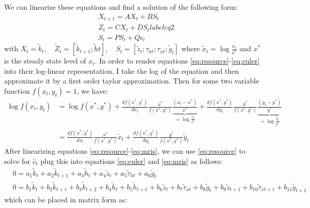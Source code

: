 \documentclass{article} %
\begin{document}
We can linearize these equations and find a solution of the following form:
\begin{align}
& X_{t+1} = A X_t + B S_t  \label{eq1} \\
& Z_t = C X_t + D S_t label{eq2} \\
& S_t = P S_t + Q \epsilon_t \label{eq3}
\end{align}
with $X_t = \tilde{k}_t, \quad \tilde{Z}_t =
[\tilde{k}_{t+1};\tilde{h}t], \quad S_t =
[\tilde{z}_t;\tau_{ht};\tau_{xt};\tilde{g}_{t}] $ where $\tilde{x}_t =
\log \frac{x_t}{x^*}$ and $x^*$ is the steady state level of
$x_t$.  In order to render equations \ref{eq:resource}-\ref{eq:euler} into their log-linear
representation, I take the log of the equation and then approximate it
by a first order taylor approximation. Then for some two variable
function $f(x_t,y_t) = 1$, we have:
\begin{align*}
 \log f(x_t,y_t) &= \log f(x^*,y^*) + \frac{df(x^*,y^*)}{dx_t} \frac{x^*}{f(x^*,y^*)}\underbrace{\frac{(x_t - x^*)}{x^*}}_{=\log \frac{x_t}{x^*}} + \frac{df(x^*,y^*)}{dy_t} \frac{y^*}{f(x^*,y^*)}\underbrace{\frac{(y_t - y^*)}{y^*}}_{=\log \frac{y_t}{y^*}} \\
& = \frac{df(x^*,y^*)}{dx_t} \frac{x^*}{f(x^*,y^*)} \tilde{x}_t +  \frac{df(x^*,y^*)}{dy_t} \frac{y^*}{f(x^*,y^*)} \tilde{y}_t
\end{align*}
After linearizing equations \ref{eq:resource}-\ref{eq:mris}, we
can use \ref{eq:resource} to solve for $\hat{c}_t$ plug this into
equations \ref{eq:euler} and \ref{eq:mris} as follows:
\begin{align}
 & 0 = a_1 \tilde{k}_t + a_2 \tilde{k}_{t+1} + a_3 \tilde{h}_{t} + a_4 \tilde{z}_{t} + a_5 \tilde{\tau}_{ht} + a_6 \tilde{g}_{t} \label{eq4} \\
 & 0 = b_1 \tilde{k}_t + b_2 \tilde{k}_{t+1} + b_3 \tilde{k}_{t+2} + b_4 \tilde{h}_{t} + b_5 \tilde{h}_{t+1} +  b_6 \tilde{z}_{t} + b_7 \tilde{\tau}_{xt} + b_8 \tilde{g}_{t} + b_9 \tilde{z}_{t+1} + b_{10} \tilde{\tau}_{xt+1} + b_{11} \tilde{g}_{t+1} \label{eq5}
  \end{align}
which can be placed in matrix form as:
\end{document}
